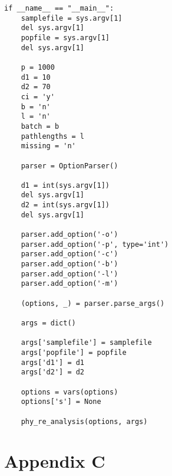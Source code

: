 \documentclass[a4paper,11pt]{article}
\begin{document}
\begin{lstlisting}
if __name__ == "__main__":
    samplefile = sys.argv[1]
    del sys.argv[1]
    popfile = sys.argv[1]
    del sys.argv[1]

    p = 1000
    d1 = 10
    d2 = 70
    ci = 'y'
    b = 'n'
    l = 'n'
    batch = b
    pathlengths = l
    missing = 'n'

    parser = OptionParser()

    d1 = int(sys.argv[1])
    del sys.argv[1]
    d2 = int(sys.argv[1])
    del sys.argv[1]

    parser.add_option('-o')
    parser.add_option('-p', type='int')
    parser.add_option('-c')
    parser.add_option('-b')
    parser.add_option('-l')
    parser.add_option('-m')

    (options, _) = parser.parse_args()

    args = dict()

    args['samplefile'] = samplefile
    args['popfile'] = popfile
    args['d1'] = d1
    args['d2'] = d2

    options = vars(options)
    options['s'] = None

    phy_re_analysis(options, args)
\end{lstlisting}

\clearpage
\section{Appendix C}
\end{document}
